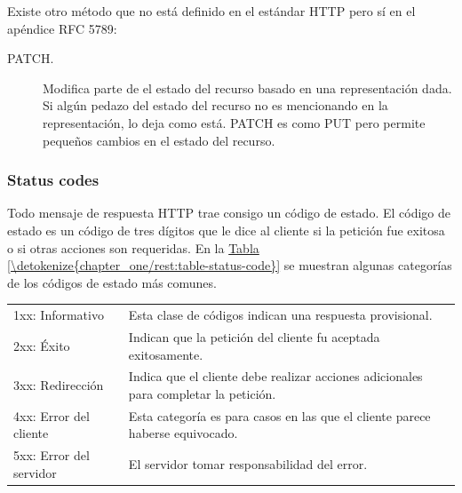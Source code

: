 Existe otro método que no está definido en el estándar HTTP pero sí en
el apéndice RFC 5789:
\begin{description}
\item[{PATCH.}] \leavevmode
Modifica parte de el estado del recurso basado en una representación
dada. Si algún pedazo del estado del recurso no es mencionando en la
representación, lo deja como está. PATCH es como PUT pero permite
pequeños cambios en el estado del recurso.

\end{description}


\subsubsection{Status codes}
\label{\detokenize{chapter_one/rest:status-codes}}
Todo mensaje de respuesta HTTP trae consigo un código de estado. El
código de estado es un código de tres dígitos que le dice al cliente si
la petición fue exitosa o si otras acciones son requeridas. En la
\hyperref[\detokenize{chapter_one/rest:table-status-code}]{Tabla \ref{\detokenize{chapter_one/rest:table-status-code}}} se muestran algunas categorías
de los códigos de estado más comunes.


\begin{savenotes}\sphinxattablestart
\centering
{}
\label{\detokenize{chapter_one/rest:table-status-code}}
\sphinxaftercaption
\begin{tabulary}{\linewidth}[t]{|T|T|}
\hline
{}\relax &\relax \\
\hline
1xx: Informativo
&
Esta clase de códigos indican una respuesta provisional.
\\
\hline
2xx: Éxito
&
Indican que la petición del cliente fu aceptada exitosamente.
\\
\hline
3xx: Redirección
&
Indica que el cliente debe realizar acciones adicionales para completar la petición.
\\
\hline
4xx: Error del cliente
&
Esta categoría es para casos en las que el cliente parece haberse equivocado.
\\
\hline
5xx: Error del servidor
&
El servidor tomar responsabilidad del error.
\\
\hline
\end{tabulary}
\par
\sphinxattableend\end{savenotes}


